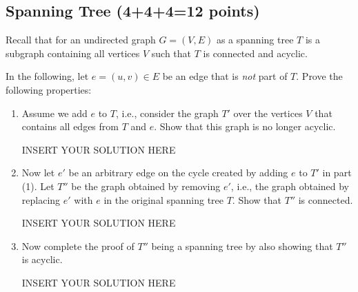 \subsection{Spanning Tree (4+4+4=12 points)}

Recall that for an undirected graph $G = (V,E)$ as a spanning tree $T$ is a subgraph containing all vertices $V$ such that $T$ is connected and acyclic. 

In the following, let $e = (u,v) \in E$ be an edge that is \emph{not} part of $T$.
Prove the following properties:

\begin{enumerate}
    \item Assume we add $e$ to $T$, i.e., consider the graph $T'$ over the vertices $V$ that contains all edges from $T$ and $e$. Show that this graph is no longer acyclic.

\begin{solution}   INSERT YOUR SOLUTION HERE   \end{solution}

    \item Now let $e'$ be an arbitrary edge on the cycle created by adding $e$ to $T'$ in part (1). Let $T''$ be the graph obtained by removing $e'$, i.e., the graph obtained by replacing $e'$ with $e$ in the original spanning tree $T$. Show that $T''$ is connected.

\begin{solution}   INSERT YOUR SOLUTION HERE   \end{solution}

    \item Now complete the proof of $T''$ being a spanning tree by also showing that $T''$ is acyclic.

\begin{solution}   INSERT YOUR SOLUTION HERE   \end{solution}
\end{enumerate}